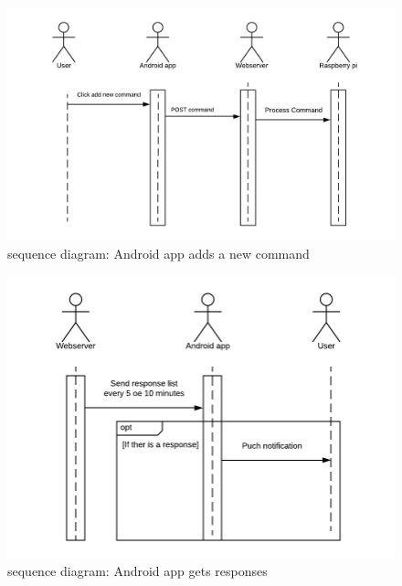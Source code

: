 \documentclass[12pt, oneside, a4paper]{book}
\begin{document}
				\begin{figure}[H]
					\caption{sequence diagram: Android app adds a new command}
					\label{android_add}
					\includegraphics[width=\linewidth]{img/sequence_android_add.jpg}
				\end{figure}
				\begin{figure}[H]
					\caption{sequence diagram: Android app gets responses}
					\label{android_response}
					\includegraphics[width=\linewidth]{img/sequence_android_response.jpg}
				\end{figure}
\end{document}
